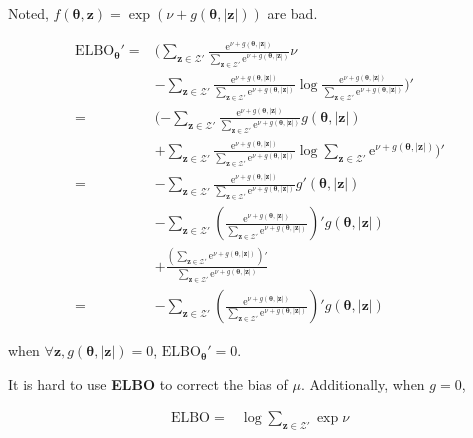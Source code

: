 \documentclass[notitlepage]{article}
\begin{document}
Noted, $f(\bm{\theta},\bm{z})=\exp{(\nu+g(\bm{\theta},|\bm{z}|))}$ are bad. 

\begin{align}
    \mathrm{ELBO}_{\bm{\theta}}' =& (\sum_{\bm{z}\in\mathcal{Z}'}\frac{\mathrm{e}^{\nu+g(\bm{\theta},|\bm{z}|)}}{\sum_{\bm{z}\in\mathcal{Z}'}\mathrm{e}^{\nu+g(\bm{\theta},|\bm{z}|)}}\nu \\
    &- \sum_{\bm{z}\in\mathcal{Z}'}\frac{\mathrm{e}^{\nu+g(\bm{\theta},|\bm{z}|)}}{\sum_{\bm{z}\in\mathcal{Z}'}\mathrm{e}^{\nu+g(\bm{\theta},|\bm{z}|)}}\log\frac{\mathrm{e}^{\nu+g(\bm{\theta},|\bm{z}|)}}{\sum_{\bm{z}\in\mathcal{Z}'}\mathrm{e}^{\nu+g(\bm{\theta},|\bm{z}|)}})' \\
    =& (-\sum_{\bm{z}\in\mathcal{Z}'}\frac{\mathrm{e}^{\nu+g(\bm{\theta},|\bm{z}|)}}{\sum_{\bm{z}\in\mathcal{Z}'}\mathrm{e}^{\nu+g(\bm{\theta},|\bm{z}|)}}g(\bm{\theta},|\bm{z}|) \\
    &+ \sum_{\bm{z}\in\mathcal{Z}'}\frac{\mathrm{e}^{\nu+g(\bm{\theta},|\bm{z}|)}}{\sum_{\bm{z}\in\mathcal{Z}'}\mathrm{e}^{\nu+g(\bm{\theta},|\bm{z}|)}}\log\sum_{\bm{z}\in\mathcal{Z}'}\mathrm{e}^{\nu+g(\bm{\theta},|\bm{z}|)})' \\
    =& -\sum_{\bm{z}\in\mathcal{Z}'}\frac{\mathrm{e}^{\nu+g(\bm{\theta},|\bm{z}|)}}{\sum_{\bm{z}\in\mathcal{Z}'}\mathrm{e}^{\nu+g(\bm{\theta},|\bm{z}|)}}g'(\bm{\theta},|\bm{z}|) \\
    &- \sum_{\bm{z}\in\mathcal{Z}'}(\frac{\mathrm{e}^{\nu+g(\bm{\theta},|\bm{z}|)}}{\sum_{\bm{z}\in\mathcal{Z}'}\mathrm{e}^{\nu+g(\bm{\theta},|\bm{z}|)}})'g(\bm{\theta},|\bm{z}|) \\
    &+ \frac{(\sum_{\bm{z}\in\mathcal{Z}'}\mathrm{e}^{\nu+g(\bm{\theta},|\bm{z}|)})'}{\sum_{\bm{z}\in\mathcal{Z}'}\mathrm{e}^{\nu+g(\bm{\theta},|\bm{z}|)}} \\
    =& -\sum_{\bm{z}\in\mathcal{Z}'}(\frac{\mathrm{e}^{\nu+g(\bm{\theta},|\bm{z}|)}}{\sum_{\bm{z}\in\mathcal{Z}'}\mathrm{e}^{\nu+g(\bm{\theta},|\bm{z}|)}})'g(\bm{\theta},|\bm{z}|)
\end{align}

when $\forall \bm{z}, g(\bm{\theta},|\bm{z}|)=0$, $\mathrm{ELBO}_{\bm{\theta}}'=0$. 

It is hard to use \textbf{ELBO} to correct the bias of $\mu$. Additionally, when $g=0$, 

\begin{align}
    \mathrm{ELBO} =& \log\sum_{\bm{z}\in\mathcal{Z}'}\exp\nu
\end{align}

\end{document}

